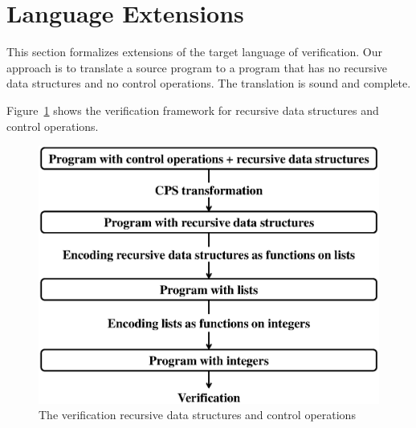 \section{Language Extensions}
\label{sec:extension}

This section formalizes extensions of the target language of
verification.  Our approach is to translate a source program to a
program that has no recursive data structures and no control operations.
The translation is sound and complete.

Figure~\ref{fig:extension} shows the verification framework for recursive data structures and control
operations.

\begin{figure}
 \begin{center}
  \includegraphics[scale=0.4]{extension.eps}
 \end{center}
\caption{The verification  recursive data structures and control operations}
\label{fig:extension}
\end{figure}

